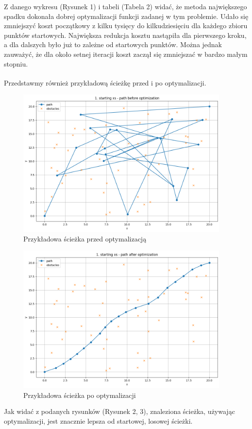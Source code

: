 \documentclass{article}
\begin{document}
Z danego wykresu (Rysunek 1) i tabeli (Tabela 2) widać, że metoda największego spadku dokonała dobrej optymalizacji funkcji zadanej w tym problemie. Udało się zmniejszyć koszt początkowy z kilku tysięcy do kilkudziesięciu dla każdego zbioru punktów startowych. Największa redukcja kosztu nastąpiła dla pierwszego kroku, a dla dalszych było już to zależne od startowych punktów. Można jednak zauważyć, że dla około setnej iteracji koszt zaczął się zmniejszać w bardzo małym stopniu.
\\\\
Przedstawmy również przykładową ścieżkę przed i po optymalizacji.
\begin{figure}[H]
    \centering
    \includegraphics[width=0.95\textwidth]{2}
    \caption{Przykładowa ścieżka przed optymalizacją}
    \label{fig:mesh}
\end{figure}
\begin{figure}[H]
    \centering
    \includegraphics[width=0.95\textwidth]{3}
    \caption{Przykładowa ścieżka po optymalizacji}
    \label{fig:mesh}
\end{figure}
Jak widać z podanych rysunków (Rysunek 2, 3), znaleziona ścieżka, używając optymalizacji, jest znacznie lepsza od startowej, losowej ścieżki.
\end{document}
